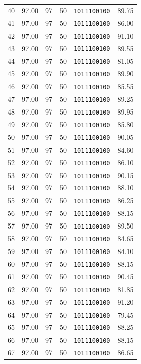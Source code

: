 \documentclass[12pt,a4paper]{article}
\begin{document}
{\begin{longtable}{c c c c c c}
40 & 97.00 & 97 & 50 & \texttt{1011100100} & 89.75 \\
41 & 97.00 & 97 & 50 & \texttt{1011100100} & 86.00 \\
42 & 97.00 & 97 & 50 & \texttt{1011100100} & 91.10 \\
43 & 97.00 & 97 & 50 & \texttt{1011100100} & 89.55 \\
44 & 97.00 & 97 & 50 & \texttt{1011100100} & 81.05 \\
45 & 97.00 & 97 & 50 & \texttt{1011100100} & 89.90 \\
46 & 97.00 & 97 & 50 & \texttt{1011100100} & 85.55 \\
47 & 97.00 & 97 & 50 & \texttt{1011100100} & 89.25 \\
48 & 97.00 & 97 & 50 & \texttt{1011100100} & 89.95 \\
49 & 97.00 & 97 & 50 & \texttt{1011100100} & 85.80 \\
50 & 97.00 & 97 & 50 & \texttt{1011100100} & 90.05 \\
51 & 97.00 & 97 & 50 & \texttt{1011100100} & 84.60 \\
52 & 97.00 & 97 & 50 & \texttt{1011100100} & 86.10 \\
53 & 97.00 & 97 & 50 & \texttt{1011100100} & 90.15 \\
54 & 97.00 & 97 & 50 & \texttt{1011100100} & 88.10 \\
55 & 97.00 & 97 & 50 & \texttt{1011100100} & 86.25 \\
56 & 97.00 & 97 & 50 & \texttt{1011100100} & 88.15 \\
57 & 97.00 & 97 & 50 & \texttt{1011100100} & 89.50 \\
58 & 97.00 & 97 & 50 & \texttt{1011100100} & 84.65 \\
59 & 97.00 & 97 & 50 & \texttt{1011100100} & 84.10 \\
60 & 97.00 & 97 & 50 & \texttt{1011100100} & 88.15 \\
61 & 97.00 & 97 & 50 & \texttt{1011100100} & 90.45 \\
62 & 97.00 & 97 & 50 & \texttt{1011100100} & 81.85 \\
63 & 97.00 & 97 & 50 & \texttt{1011100100} & 91.20 \\
64 & 97.00 & 97 & 50 & \texttt{1011100100} & 79.45 \\
65 & 97.00 & 97 & 50 & \texttt{1011100100} & 88.25 \\
66 & 97.00 & 97 & 50 & \texttt{1011100100} & 88.15 \\
67 & 97.00 & 97 & 50 & \texttt{1011100100} & 86.65 \\

\end{longtable}}
\end{document}
